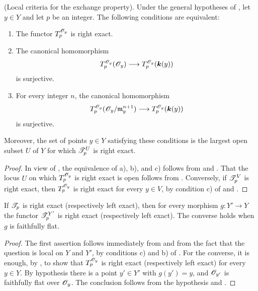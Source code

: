 \begin{proposition}[7.7.10]
\label{III.7.7.10}
\textnormal{(Local criteria for the exchange property).}
Under the general hypotheses of , let
$y\in Y$ and let $p$ be an integer.  The following
conditions are equivalent:
\begin{enumerate}
  \item[a)] The functor $T_p^{\mathscr{O}_y}$ is right exact.

  \item[b)] The canonical homomorphism
    \[
      T_p^{\mathscr{O}_y}(\mathscr{O}_y)
      \longrightarrow
      T_p^{\mathscr{O}_y}(\boldsymbol{k}(y))
    \]
    is surjective.

  \item[c)] For every integer $n$, the canonical
    homomorphism
    \[
      T_p^{\mathscr{O}_y}
      (\mathscr{O}_y/\mathfrak m_y^{n+1})
      \longrightarrow
      T_p^{\mathscr{O}_y}(\boldsymbol{k}(y))
    \]
    is surjective.
\end{enumerate}
Moreover, the set of points $y\in Y$ satisfying these
conditions is the largest open subset $U$ of $Y$ for which
$\mathscr{T}^U_p$ is right exact.
\end{proposition}

\begin{proof}
In view of , the equivalence of a), b), and
c) follows from  and .
That the locus $U$ on which $T_p^{\mathscr{O}_y}$ is right exact
is open follows from .  Conversely, if
$\mathscr{T}^V_p$ is right exact, then
$T_p^{\mathscr{O}_y}$ is right exact for every $y\in V$, by
condition c) of  and .
\end{proof}

\begin{corollary}[7.7.11]
\label{III.7.7.11}
If $\mathscr{T}_p$ is right exact (respectively left exact), then
for every morphism $g:Y'\to Y$ the functor
$\mathscr{T}^{Y'}_p$ is right exact (respectively left exact).
The converse holds when $g$ is faithfully flat.
\end{corollary}

\begin{proof}
The first assertion follows immediately from
 and from the fact that the question is
local on $Y$ and $Y'$, by conditions c) and b) of
.  For the converse, it is enough, by
, to show that $T_p^{\mathscr{O}_y}$ is right
exact (respectively left exact) for every $y\in Y$.  By
hypothesis there is a point $y'\in Y'$ with $g(y')=y$, and
$\mathscr{O}_{y'}$ is faithfully flat over $\mathscr{O}_y$.  The
conclusion follows from the hypothesis and
.
\end{proof}

